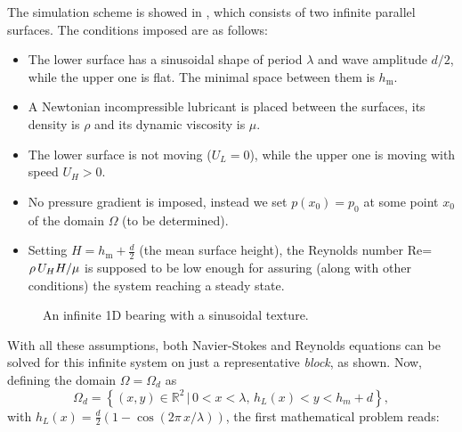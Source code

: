 The simulation scheme is showed in , which consists of two infinite parallel surfaces. The conditions imposed are as follows:
\begin{itemize}
\item The lower surface has a sinusoidal shape of period $\lambda$ and wave amplitude $d/2$, while the upper one is flat. The minimal space between them is $h_\text{m}$.
\item A Newtonian incompressible lubricant is placed between the surfaces, its density is $\rho$ and its dynamic viscosity is $\mu$.
\item The lower surface is not moving ($U_L=0$), while the upper one is moving with speed $U_H>0$.
\item No pressure gradient is imposed, instead we set $p(x_0)=p_0$ at some point $x_0$ of the domain $\Omega$ (to be determined).
\item Setting $H=h_\text{m}+\frac{d}{2}$ (the mean surface height), the Reynolds number Re=$\nobreak\rho\, U_H H/\mu$ is supposed to be low enough for assuring (along with other conditions) the system reaching a steady state.
\end{itemize}
 \begin{figure}[ht]
 \centering 
 \def\svgwidth{\textwidth}	
\caption{An infinite 1D bearing with a sinusoidal texture.}\label{fig:textured_surface_problem}
\end{figure}
With all these assumptions, both Navier-Stokes and Reynolds equations can be solved for this infinite system on just a representative \emph{block}, as  shown. Now, defining the domain $\Omega=\Omega_d$ as
$$\Omega_d = \left\{(x,y)\in \mathbb{R}^2\,|\,0< x< \lambda,\,h_L(x)< y< h_m+d\right\},$$
with $h_L(x)=\frac{d}{2}\left(1-\cos(2\pi\,x/\lambda)\right)$, the first mathematical problem reads:\newpage
\hspace*{0cm}
